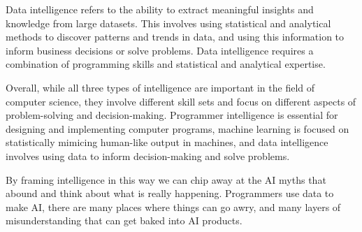 Data intelligence  refers to the ability to extract meaningful insights and knowledge from large datasets. This involves using statistical and analytical methods to discover patterns and trends in data, and using this information to inform business decisions or solve problems. Data intelligence requires a combination of programming skills and statistical and analytical expertise.

Overall, while all three types of intelligence are important in the field of computer science, they involve different skill sets and focus on different aspects of problem-solving and decision-making. Programmer intelligence is essential for designing and implementing computer programs, machine learning is focused on statistically mimicing human-like output in machines, and data intelligence involves using data to inform decision-making and solve problems.

By framing intelligence in this way we can chip away at the AI myths that abound and think about what is really happening. Programmers use data to make AI, there are many places where things can go awry, and many layers of misunderstanding that can get baked into AI products.


